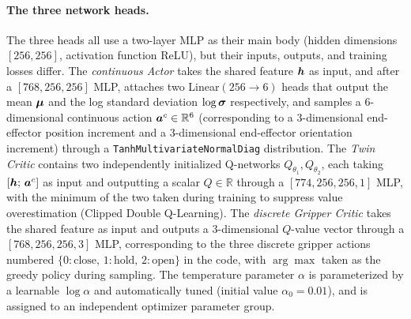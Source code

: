 \paragraph{The three network heads.} The three heads all use a two-layer MLP as their main body (hidden dimensions $[256, 256]$, activation function ReLU), but their inputs, outputs, and training losses differ. The \emph{continuous Actor} takes the shared feature $\bm{h}$ as input, and after a $[768, 256, 256]$ MLP, attaches two Linear$(256 \to 6)$ heads that output the mean $\bm{\mu}$ and the log standard deviation $\log\bm{\sigma}$ respectively, and samples a 6-dimensional continuous action $\bm{a}^c \in \mathbb{R}^6$ (corresponding to a 3-dimensional end-effector position increment and a 3-dimensional end-effector orientation increment) through a \texttt{TanhMultivariateNormalDiag} distribution. The \emph{Twin Critic} contains two independently initialized Q-networks $Q_{\theta_1}, Q_{\theta_2}$, each taking $[\bm{h};\, \bm{a}^c]$ as input and outputting a scalar $Q \in \mathbb{R}$ through a $[774, 256, 256, 1]$ MLP, with the minimum of the two taken during training to suppress value overestimation (Clipped Double Q-Learning). The \emph{discrete Gripper Critic} takes the shared feature as input and outputs a 3-dimensional $Q$-value vector through a $[768, 256, 256, 3]$ MLP, corresponding to the three discrete gripper actions numbered $\{0{:}\text{close},\, 1{:}\text{hold},\, 2{:}\text{open}\}$ in the code, with $\arg\max$ taken as the greedy policy during sampling. The temperature parameter $\alpha$ is parameterized by a learnable $\log\alpha$ and automatically tuned (initial value $\alpha_0 = 0.01$), and is assigned to an independent optimizer parameter group.


